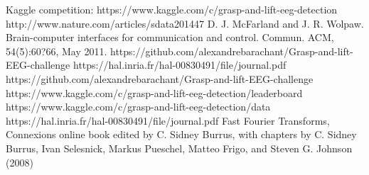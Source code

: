 \documentclass[final,leqno,onefignum,onetabnum]{siamltexmm}
\begin{document}
\begin{thebibliography}{1}
   Kaggle competition:  https://www.kaggle.com/c/grasp-and-lift-eeg-detection
   http://www.nature.com/articles/sdata201447
  D. J. McFarland and J. R. Wolpaw. Brain-computer interfaces for communication and control. Commun. ACM, 54(5):60?66, May 2011.
  https://github.com/alexandrebarachant/Grasp-and-lift-EEG-challenge
  https://hal.inria.fr/hal-00830491/file/journal.pdf
  https://github.com/alexandrebarachant/Grasp-and-lift-EEG-challenge
  https://www.kaggle.com/c/grasp-and-lift-eeg-detection/leaderboard
  https://www.kaggle.com/c/grasp-and-lift-eeg-detection/data
  https://hal.inria.fr/hal-00830491/file/journal.pdf
  Fast Fourier Transforms, Connexions online book edited by C. Sidney Burrus, with chapters by C. Sidney Burrus, Ivan Selesnick, Markus Pueschel, Matteo Frigo, and Steven G. Johnson (2008)
\end{thebibliography} 
\end{document}
